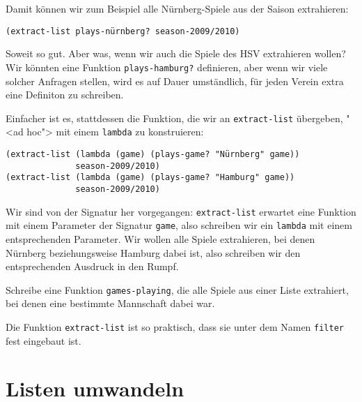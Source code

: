 %
Damit können wir zum Beispiel alle Nürnberg-Spiele aus der Saison
extrahieren:
%
\begin{lstlisting}
(extract-list plays-nürnberg? season-2009/2010)
\end{lstlisting}
%
Soweit so gut.  Aber was, wenn wir auch die Spiele des HSV extrahieren
wollen?  Wir könnten eine Funktion \lstinline{plays-hamburg?}
definieren, aber wenn wir viele solcher Anfragen stellen, wird es auf
Dauer umständlich, für jeden Verein extra eine Definiton zu schreiben.

Einfacher ist es, stattdessen die Funktion, die wir an
\lstinline{extract-list} übergeben, "<ad hoc"> mit einem
\lstinline{lambda} zu konstruieren:\label{code:extract-list-plays-game}
%
\begin{lstlisting}
(extract-list (lambda (game) (plays-game? "Nürnberg" game)) 
              season-2009/2010)
(extract-list (lambda (game) (plays-game? "Hamburg" game)) 
              season-2009/2010)
\end{lstlisting}
%
Wir sind von der Signatur her vorgegangen: \lstinline{extract-list}
erwartet eine Funktion mit einem Parameter der Signatur
\lstinline{game}, also schreiben wir ein \lstinline{lambda} mit einem
entsprechenden Parameter.  Wir wollen alle Spiele extrahieren, bei
denen Nürnberg beziehungsweise Hamburg dabei ist, also schreiben wir
den entsprechenden Ausdruck in den Rumpf.
%
\begin{aufgabeinline}
  Schreibe eine Funktion \lstinline{games-playing}, die alle Spiele
  aus einer Liste extrahiert, bei denen eine bestimmte Mannschaft dabei war.
\end{aufgabeinline}
%
Die Funktion \lstinline{extract-list} ist so praktisch, dass sie unter
dem Namen \lstinline{filter} fest
eingebaut ist.\label{func:filter}

\section{Listen umwandeln}

